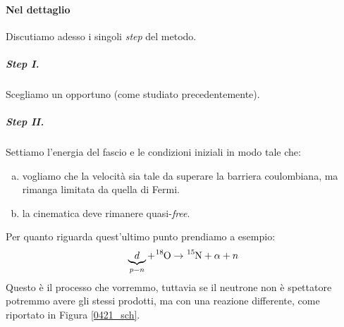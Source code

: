 \paragraph{Nel dettaglio}
Discutiamo adesso i singoli \textit{step} del metodo.
\subparagraph{Step I.} 
Scegliamo un opportuno  (come studiato precedentemente).
\subparagraph{Step II.} 
Settiamo l'energia del fascio e le condizioni iniziali in modo tale che:
\begin{enumerate}[(a)]
	\item vogliamo che la velocità sia tale da superare la barriera coulombiana, ma rimanga limitata da quella di Fermi.
	\item la cinematica deve rimanere quasi-\textit{free}.
\end{enumerate}
\noindent Per quanto riguarda quest'ultimo punto prendiamo a esempio:
$$\underbrace{d}_{p-n} + \ce{^{18}O} \to \ce{^{15}N} + \alpha + n$$
Questo è il processo che vorremmo, tuttavia se il neutrone non è spettatore potremmo avere gli stessi prodotti, ma con una reazione differente, come riportato in Figura \ref{0421_sch}. 
